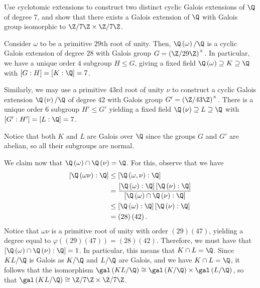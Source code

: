 \documentclass[10pt]{mypackage}
\begin{document}
\begin{problem}[Problem 7]
  Use cyclotomic extensions to construct two distinct cyclic Galois extensions of $\Q$ of degree $7$, and show that there exists a Galois extension of $\Q$ with Galois group isomorphic to $\Z/7\Z\times \Z/7\Z$.
\end{problem}
\begin{solution}
  Consider $\omega$ to be a primitive $29$th root of unity. Then, $\Q\left( \omega \right)/\Q$ is a cyclic Galois extension of degree $28$ with Galois group $G = \left( \Z/29\Z \right)^{\times}$. In particular, we have a unique order $4$ subgroup $H\leq G$, giving a fixed field $\Q\left( \omega \right)\supseteq K\supseteq \Q$ with $\left[ G:H \right] = \left[ K:\Q \right] = 7$.

  Similarly, we may use a primitive $43$rd root of unity $\nu$ to construct a cyclic Galois extension $\Q\left( \nu \right)/\Q$ of degree $42$ with Galois group $G' = \left( \Z/43\Z \right)^{\times}$. There is a unique order $6$ subgroup $H'\leq G'$ yielding a fixed field $\Q\left( \nu \right)\supseteq L\supseteq \Q$ with $\left[ G':H' \right]= \left[ L:\Q \right] = 7$.

  Notice that both $K$ and $L$ are Galois over $\Q$ since the groups $G$ and $G'$ are abelian, so all their subgroups are normal.

  We claim now that $\Q\left( \omega \right)\cap \Q\left( \nu \right) = \Q$. For this, observe that we have
  \begin{align*}
    \left[ \Q\left( \omega\nu \right):\Q \right] &\leq \left[ \Q\left( \omega,\nu \right):\Q \right]\\
    &= \frac{\left[ \Q\left( \omega \right):\Q \right]\left[ \Q\left( \nu \right):\Q \right]}{\left[ \Q\left( \omega \right)\cap \Q\left( \nu \right):\Q \right]}\\
    &\leq \left[ \Q\left( \omega \right):\Q \right]\left[ \Q\left( \nu \right):\Q \right]\\
    &= \left( 28 \right)\left( 42 \right).
  \end{align*}
  Notice that $\omega\nu$ is a primitive root of unity with order $(29)(47)$, yielding a degree equal to $\varphi\left( (29)(47) \right) = (28)(42)$. Therefore, we must have that $\left[ \Q\left( \omega \right)\cap \Q\left( \nu \right):\Q \right] = 1$. In particular, this means that $K\cap L = \Q$. Since $KL/\Q$ is Galois as $K/\Q$ and $L/\Q$ are Galois, and we have $K\cap L = \Q$, it follows that the isomorphism $\gal\left( KL/\Q \right)\cong \gal\left( K/\Q \right)\times \gal\left( L/\Q \right)$, so that $\gal\left( KL/\Q \right)\cong \Z/7\Z\times\Z/7\Z$.
\end{solution}
\end{document}
